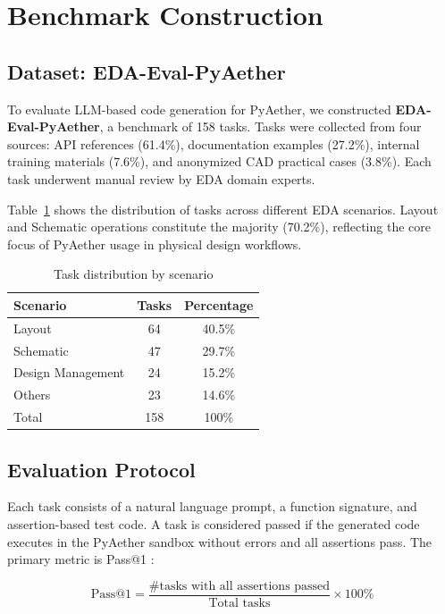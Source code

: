 \section{Benchmark Construction}
\label{sec:benchmark}

\subsection{Dataset: EDA-Eval-PyAether}

To evaluate LLM-based code generation for PyAether, we constructed \textbf{EDA-Eval-PyAether}, a benchmark of 158 tasks. Tasks were collected from four sources: API references (61.4\%), documentation examples (27.2\%), internal training materials (7.6\%), and anonymized CAD practical cases (3.8\%). Each task underwent manual review by EDA domain experts.

Table~\ref{tab:scenario-distribution} shows the distribution of tasks across different EDA scenarios. Layout and Schematic operations constitute the majority (70.2\%), reflecting the core focus of PyAether usage in physical design workflows.

\begin{table}[htbp]
\centering
\caption{Task distribution by scenario}
\label{tab:scenario-distribution}
\begin{tabular}{lcc}
\toprule
\textbf{Scenario} & \textbf{Tasks} & \textbf{Percentage} \\
\midrule
Layout & 64 & 40.5\% \\
Schematic & 47 & 29.7\% \\
Design Management & 24 & 15.2\% \\
Others & 23 & 14.6\% \\
\midrule
Total & 158 & 100\% \\
\bottomrule
\end{tabular}
\end{table}

\subsection{Evaluation Protocol}

Each task consists of a natural language prompt, a function signature, and assertion-based test code. A task is considered passed if the generated code executes in the PyAether sandbox without errors and all assertions pass. The primary metric is Pass@1 \cite{chen2021evaluating}:

\[
\text{Pass@1} = \frac{\text{\# tasks with all assertions passed}}{\text{Total tasks}} \times 100\%
\]

